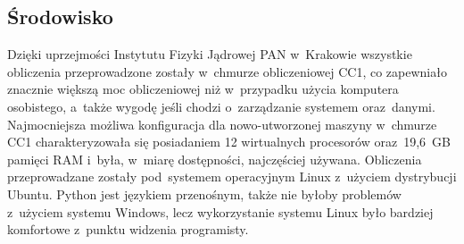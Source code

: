 \subsection{Środowisko}
Dzięki uprzejmości Instytutu Fizyki Jądrowej PAN w~Krakowie wszystkie obliczenia przeprowadzone zostały w~chmurze obliczeniowej CC1\cite{cc1Article}, co zapewniało znacznie większą moc obliczeniowej niż w~przypadku użycia komputera osobistego, a~także wygodę jeśli chodzi o~zarządzanie systemem oraz~danymi. Najmocniejsza możliwa konfiguracja dla nowo-utworzonej maszyny w~chmurze CC1 charakteryzowała się posiadaniem 12 wirtualnych procesorów oraz~19,6~GB pamięci RAM i~była, w~miarę dostępności, najczęściej używana. Obliczenia przeprowadzane zostały pod~systemem operacyjnym Linux z~użyciem dystrybucji Ubuntu. Python jest językiem przenośnym, także nie byłoby problemów z~użyciem systemu Windows, lecz wykorzystanie systemu Linux było bardziej komfortowe z~punktu widzenia programisty.

